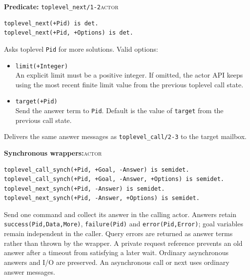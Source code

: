 \vspace{5mm}




\noindent \textbf{Predicate:} \texttt{toplevel\_\allowbreak{}next/\allowbreak{}1-2}\hfill\textsc{actor}

\begin{verbatim}
toplevel_next(+Pid) is det.
toplevel_next(+Pid, +Options) is det.
\end{verbatim}

\noindent Asks toplevel \texttt{Pid} for more solutions. Valid options:

\begin{itemize}
\item
  \texttt{limit(\allowbreak{}+Integer)}\\
  An explicit limit must be a positive integer. If omitted, the actor API
  keeps using the most recent finite limit value from the
  previous toplevel call state.
\item
  \texttt{target(\allowbreak{}+Pid)}\\
  Send the answer term to \texttt{Pid}. Default is the value of
  \texttt{target} from the previous call state.
\end{itemize}

\noindent Delivers the same answer messages as \texttt{toplevel\_\allowbreak{}call/\allowbreak{}2-3}
to the target mailbox.\\



\noindent \textbf{Synchronous wrappers:}\hfill\textsc{actor}


\begin{verbatim}
toplevel_call_synch(+Pid, +Goal, -Answer) is semidet.
toplevel_call_synch(+Pid, +Goal, -Answer, +Options) is semidet.
toplevel_next_synch(+Pid, -Answer) is semidet.
toplevel_next_synch(+Pid, -Answer, +Options) is semidet.
\end{verbatim}

\noindent Send one command and collect its answer in the calling actor. Answers retain
\texttt{success(\allowbreak{}Pid,\allowbreak{}Data,\allowbreak{}More)}, \texttt{failure(\allowbreak{}Pid)} and \texttt{error(\allowbreak{}Pid,\allowbreak{}Error)}; goal variables
remain independent in the caller. Query errors are returned as answer terms rather than thrown by
the wrapper. A private request reference prevents an old answer after a timeout from satisfying a
later wait. Ordinary asynchronous answers and I/O are preserved. An asynchronous call or next uses
ordinary answer messages.

